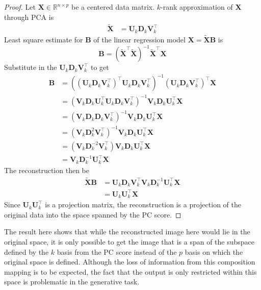 \documentclass[12pt]{article}
\begin{document}
\begin{proof}
    Let $\mathbf{X}\in \mathbb{R}^{n\times p}$ be a centered data matrix. $k$-rank approximation of $\mathbf{X}$ through PCA is \begin{align*}
        \tilde{\mathbf{X}} &= \mathbf{U}_k \mathbf{D}_k \mathbf{V}^\top_k
    \end{align*}
Least square estimate for $\mathbf{B}$ of the linear regression model 
$\mathbf{X} = \tilde{\mathbf{X}}\mathbf{B}$
is $$\mathbf{B} = \left(\tilde{\mathbf{X}}^\top\tilde{\mathbf{X}}\right)^{-1}\tilde{\mathbf{X}}^\top \mathbf{X}$$ 
Substitute in the $\mathbf{U}_k \mathbf{D}_k \mathbf{V}^\top_k$ to get
\begin{align*}
    \mathbf{B} &=\left((\mathbf{U}_k \mathbf{D}_k \mathbf{V}^\top_k)^\top \mathbf{U}_k \mathbf{D}_k \mathbf{V}^\top_k\right)^{-1} (\mathbf{U}_k \mathbf{D}_k \mathbf{V}^\top_k)^\top \mathbf{X}\\
    &= \left(\mathbf{V}_k \mathbf{D}_k \mathbf{U}^\top_k\mathbf{U}_k \mathbf{D}_k \mathbf{V}^\top_k\right)^{-1}\mathbf{V}_k \mathbf{D}_k \mathbf{U}^\top_k\mathbf{X}\\
    &= \left(\mathbf{V}_k \mathbf{D}_k\mathbf{D}_k \mathbf{V}^\top_k\right)^{-1}\mathbf{V}_k \mathbf{D}_k \mathbf{U}^\top_k\mathbf{X}\\
    &= \left(\mathbf{V}_k \mathbf{D}^2_k \mathbf{V}^\top_k\right)^{-1}\mathbf{V}_k \mathbf{D}_k \mathbf{U}^\top_k\mathbf{X}\\
    &= \left(\mathbf{V}_k \mathbf{D}^{-2}_k \mathbf{V}^\top_k\right)\mathbf{V}_k \mathbf{D}_k \mathbf{U}^\top_k\mathbf{X}\\
    &= \mathbf{V}_k \mathbf{D}_k^{-1}\mathbf{U}^\top_k \mathbf{X}
\end{align*}
The reconstruction then be 
\begin{align*}
    \tilde{\mathbf{X}}\mathbf{B} &= \mathbf{U}_k \mathbf{D}_k \mathbf{V}^\top_k\mathbf{V}_k\mathbf{D}_k^{-1}\mathbf{U}^\top_k \mathbf{X}\\ 
    &= \mathbf{U}_k\mathbf{U}_k^\top \mathbf{X}
\end{align*}
Since $\mathbf{U}_k\mathbf{U}_k^\top$ is a projection matrix, the reconstruction is a projection of the original data into the space spanned by the PC score.
\end{proof}

The result here shows that while the reconstructed image here would lie in the original space, it is only possible to get the image that is a span of the subspace defined by the $k$ basis from the PC score instead of the $p$ basis on which the original space is defined. Although the loss of information from this composition mapping is to be expected, the fact that the output is only restricted within this space is problematic in the generative task.
\end{document}
